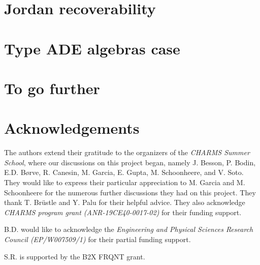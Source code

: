 \documentclass{amsart}
\theoremstyle{plain}
\begin{document}
\section{Jordan recoverability}
\label{sec:JR}


\section{Type ADE algebras case}
\label{sec:TypeA}
%



\section{To go further}
\label{sec:further}


\section*{Acknowledgements}

The authors extend their gratitude to the organizers of the \emph{CHARMS Summer School}, where our discussions on this project began, namely J. Besson, P. Bodin, E.D. Børve, R. Canesin, M. Garcia, E. Gupta, M. Schoonheere, and V. Soto. They would like to express their particular appreciation to M. Garcia and M. Schoonheere for the numerous further discussions they had on this project. They thank T. Brüstle and Y. Palu for their helpful advice. They also acknowledge \textit{CHARMS program grant (ANR-19CE40-0017-02)} for their funding support. 

B.D. would like to acknowledge the \textit{Engineering and Physical Sciences Research Council (EP/W007509/1)} for their partial funding support. 

S.R. is supported by the B2X FRQNT grant.



\end{document}
